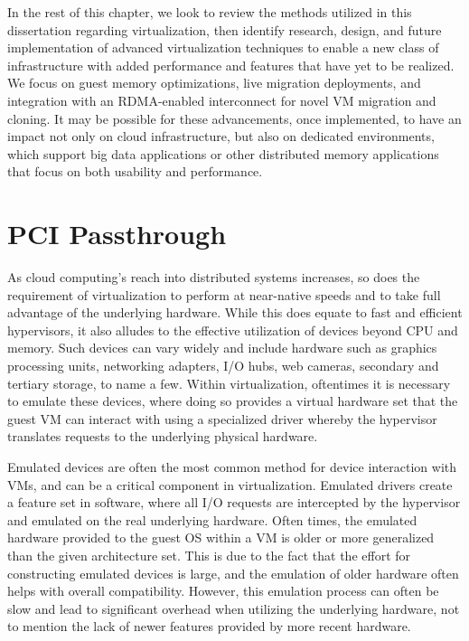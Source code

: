 In the rest of this chapter, we look to review the methods utilized in this dissertation regarding virtualization, then identify research, design, and future implementation of advanced virtualization techniques to enable a new class of infrastructure with added performance and features that have yet to be realized.  We focus on guest memory optimizations, live migration deployments, and integration with an RDMA-enabled interconnect for novel VM migration and cloning.  It may be possible for these advancements, once implemented, to have an impact not only on cloud infrastructure, but also on dedicated environments, which support big data applications or other distributed memory applications that focus on both usability and performance.


\section{PCI Passthrough}

As cloud computing's reach into distributed systems increases, so does the requirement of virtualization to perform at near-native speeds and to take full advantage of the underlying hardware. While this does equate to fast and efficient hypervisors, it also alludes to the effective utilization of devices beyond CPU and memory.  Such devices can vary widely and include hardware such as graphics processing units, networking adapters,  I/O hubs, web cameras, secondary and tertiary storage, to name a few. Within virtualization, oftentimes it is necessary to emulate these devices, where doing so provides a virtual hardware set that the guest VM can interact with using a specialized driver whereby the hypervisor translates requests to the underlying physical hardware.

Emulated devices are often the most common method for device interaction with VMs, and can be a critical component in virtualization. Emulated drivers create a feature set in software, where all I/O requests are intercepted by the hypervisor and emulated on the real underlying hardware. Often times, the emulated hardware provided to the guest OS within a VM is older or more generalized than the given architecture set. This is due to the fact that the effort for constructing emulated devices is large, and the emulation of older hardware often helps with overall compatibility. However, this emulation process can often be slow and  lead to significant overhead when utilizing the underlying hardware, not to mention the lack of newer features provided by more recent hardware.

